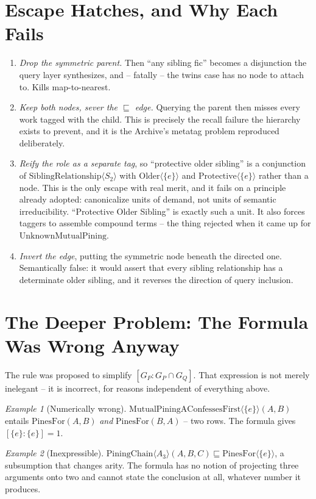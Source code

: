 \documentclass{amsart}
\theoremstyle{remark}
\newtheorem{eg}{Example}
\begin{document}
    \section{Escape Hatches, and Why Each Fails}
    \begin{enumerate}
        \item \emph{Drop the symmetric parent.} Then ``any sibling fic'' becomes a disjunction the query layer synthesizes, and -- fatally -- the twins case has no node to attach to. Kills map-to-nearest.
        \item \emph{Keep both nodes, sever the $\sqsubseteq$ edge.} Querying the parent then misses every work tagged with the child. This is precisely the recall failure the hierarchy exists to prevent, and it is the Archive's metatag problem reproduced deliberately.
        \item \emph{Reify the role as a separate tag}, so ``protective older sibling'' is a conjunction of $\mathrm{SiblingRelationship}\langle S_2\rangle$ with $\mathrm{Older}\langle\{e\}\rangle$ and $\mathrm{Protective}\langle\{e\}\rangle$ rather than a node. This is the only escape with real merit, and it fails on a principle already adopted: canonicalize units of demand, not units of semantic irreducibility. ``Protective Older Sibling'' is exactly such a unit. It also forces taggers to assemble compound terms -- the thing rejected when it came up for $\mathrm{UnknownMutualPining}$.
        \item \emph{Invert the edge}, putting the symmetric node beneath the directed one. Semantically false: it would assert that every sibling relationship has a determinate older sibling, and it reverses the direction of query inclusion.
    \end{enumerate}

    \section{The Deeper Problem: The Formula Was Wrong Anyway}
    The rule was proposed to simplify $[G_P : G_P \cap G_Q]$. That expression is not merely inelegant -- it is incorrect, for reasons independent of everything above.

    \begin{eg}[Numerically wrong]
        $\mathrm{MutualPiningAConfessesFirst}\langle\{e\}\rangle(A,B)$ entails $\mathrm{PinesFor}(A,B)$ \emph{and} $\mathrm{PinesFor}(B,A)$ -- two rows. The formula gives $[\{e\} : \{e\}] = 1$.
    \end{eg}
    \begin{eg}[Inexpressible]
        $\mathrm{PiningChain}\langle A_3\rangle(A,B,C) \sqsubseteq \mathrm{PinesFor}\langle\{e\}\rangle$, a subsumption that changes arity. The formula has no notion of projecting three arguments onto two and cannot state the conclusion at all, whatever number it produces.
    \end{eg}
\end{document}
